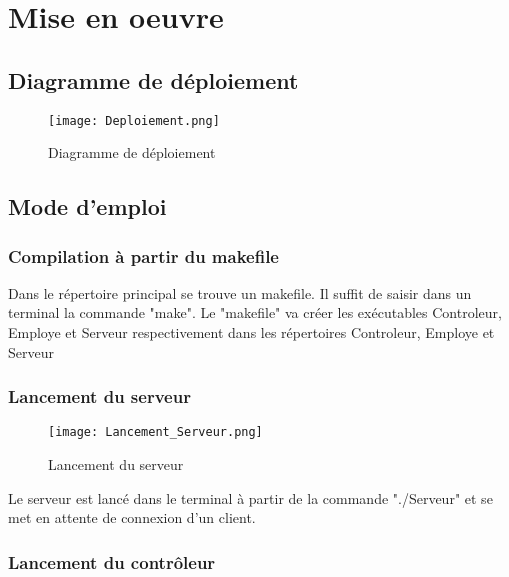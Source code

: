 \chapter{Mise en oeuvre} \label{Mise en oeuvre}

\section{Diagramme de déploiement}


\begin{center}
\begin{figure}[H] \centering
\texttt{[image: Deploiement.png]}\\
\caption{\label{LancServeur} Diagramme de déploiement }
\end{figure}
\end{center}

\section{Mode d'emploi}

\subsection{Compilation à partir du makefile}

Dans le répertoire principal se trouve un makefile. Il suffit de saisir dans un terminal la commande "make". Le "makefile" va créer les exécutables Controleur, Employe et Serveur respectivement dans les répertoires Controleur, Employe et Serveur

\subsection{Lancement du serveur}

\begin{center}
\begin{figure}[H] \centering
\texttt{[image: Lancement\_Serveur.png]}\\
\caption{\label{LancServeur} Lancement du serveur }
\end{figure}
\end{center}

Le serveur est lancé dans le terminal à partir de la commande "./Serveur" et se met en attente de connexion d'un client.\\


\subsection{Lancement du contrôleur}

